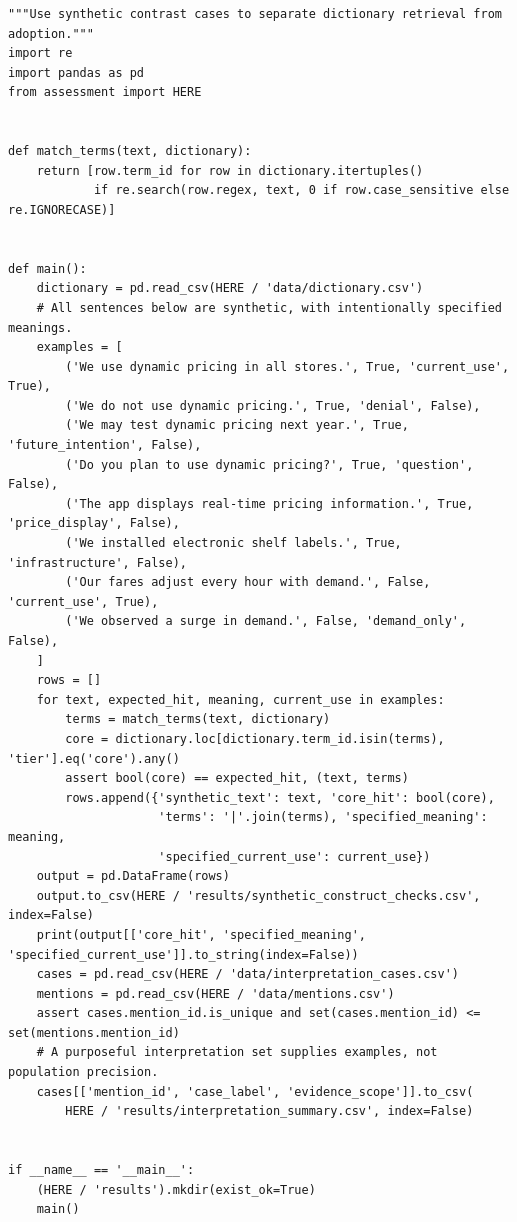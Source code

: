 \begin{Verbatim}[breaklines,breakanywhere,fontsize=\small]
"""Use synthetic contrast cases to separate dictionary retrieval from adoption."""
import re
import pandas as pd
from assessment import HERE


def match_terms(text, dictionary):
    return [row.term_id for row in dictionary.itertuples()
            if re.search(row.regex, text, 0 if row.case_sensitive else re.IGNORECASE)]


def main():
    dictionary = pd.read_csv(HERE / 'data/dictionary.csv')
    # All sentences below are synthetic, with intentionally specified meanings.
    examples = [
        ('We use dynamic pricing in all stores.', True, 'current_use', True),
        ('We do not use dynamic pricing.', True, 'denial', False),
        ('We may test dynamic pricing next year.', True, 'future_intention', False),
        ('Do you plan to use dynamic pricing?', True, 'question', False),
        ('The app displays real-time pricing information.', True, 'price_display', False),
        ('We installed electronic shelf labels.', True, 'infrastructure', False),
        ('Our fares adjust every hour with demand.', False, 'current_use', True),
        ('We observed a surge in demand.', False, 'demand_only', False),
    ]
    rows = []
    for text, expected_hit, meaning, current_use in examples:
        terms = match_terms(text, dictionary)
        core = dictionary.loc[dictionary.term_id.isin(terms), 'tier'].eq('core').any()
        assert bool(core) == expected_hit, (text, terms)
        rows.append({'synthetic_text': text, 'core_hit': bool(core),
                     'terms': '|'.join(terms), 'specified_meaning': meaning,
                     'specified_current_use': current_use})
    output = pd.DataFrame(rows)
    output.to_csv(HERE / 'results/synthetic_construct_checks.csv', index=False)
    print(output[['core_hit', 'specified_meaning', 'specified_current_use']].to_string(index=False))
    cases = pd.read_csv(HERE / 'data/interpretation_cases.csv')
    mentions = pd.read_csv(HERE / 'data/mentions.csv')
    assert cases.mention_id.is_unique and set(cases.mention_id) <= set(mentions.mention_id)
    # A purposeful interpretation set supplies examples, not population precision.
    cases[['mention_id', 'case_label', 'evidence_scope']].to_csv(
        HERE / 'results/interpretation_summary.csv', index=False)


if __name__ == '__main__':
    (HERE / 'results').mkdir(exist_ok=True)
    main()
\end{Verbatim}

